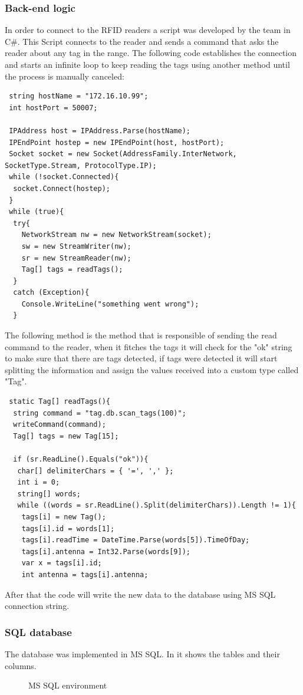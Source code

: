 \documentclass[a4paper,twoside]{article}
\begin{document}
\subsubsection{Back-end logic}
In order to connect to the RFID readers a script was developed by the team in C\#. This Script connects to the reader and sends a command that asks the reader about any tag in the range. The following code establishes the connection and starts an infinite loop to keep reading the tags using another method until the process is manually canceled:
\lstset{style=sharpc}
\begin{lstlisting}
 string hostName = "172.16.10.99";
 int hostPort = 50007;

 IPAddress host = IPAddress.Parse(hostName);
 IPEndPoint hostep = new IPEndPoint(host, hostPort);
 Socket socket = new Socket(AddressFamily.InterNetwork, SocketType.Stream, ProtocolType.IP);
 while (!socket.Connected){
  socket.Connect(hostep);
 }
 while (true){
  try{
    NetworkStream nw = new NetworkStream(socket);
    sw = new StreamWriter(nw);
    sr = new StreamReader(nw);
    Tag[] tags = readTags();
  }
  catch (Exception){
    Console.WriteLine("something went wrong");
  }
\end{lstlisting}
The following method is the method that is responsible of sending the read command to the reader, when it fitches the tags it will check for the "ok" string to make sure that there are tags detected, if tags were detected it will start splitting the information and assign the values received into a custom type called "Tag".
\lstset{style=sharpc}
\begin{lstlisting}
 static Tag[] readTags(){ 
  string command = "tag.db.scan_tags(100)";
  writeCommand(command);
  Tag[] tags = new Tag[15];

  if (sr.ReadLine().Equals("ok")){
   char[] delimiterChars = { '=', ',' };
   int i = 0;
   string[] words;
   while ((words = sr.ReadLine().Split(delimiterChars)).Length != 1){
    tags[i] = new Tag();
    tags[i].id = words[1];
    tags[i].readTime = DateTime.Parse(words[5]).TimeOfDay;
    tags[i].antenna = Int32.Parse(words[9]);
    var x = tags[i].id;
    int antenna = tags[i].antenna;
\end{lstlisting}
After that the code will write the new data to the database using MS SQL connection string.

\subsubsection{SQL database} The database was implemented in MS SQL. In  it shows the tables and their columns.\\
\begin{figure}[ht]
\centering
{}
\caption{MS SQL environment}
\label{sql}
\end{figure}
\end{document}
